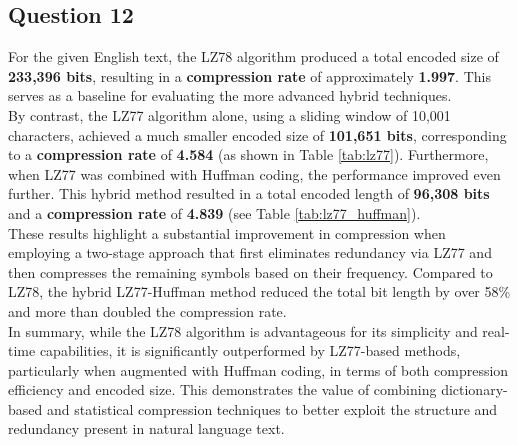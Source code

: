 \documentclass[]{template}
\begin{document}
    \subsection{Question 12}

    For the given English text, the LZ78 algorithm produced a total encoded size of \textbf{233,396 bits}, 
    resulting in a \textbf{compression rate} of approximately \textbf{1.997}. 
    This serves as a baseline for evaluating the more advanced hybrid techniques.\\

    \noindent
    By contrast, the LZ77 algorithm alone, using a sliding window of 10,001 characters, 
    achieved a much smaller encoded size of \textbf{101,651 bits}, corresponding to a \textbf{compression rate} of \textbf{4.584} (as shown in Table \ref{tab:lz77}). 
    Furthermore, when LZ77 was combined with Huffman coding, the performance improved even further.
    This hybrid method resulted in a total encoded length of \textbf{96,308 bits} and a \textbf{compression rate} of \textbf{4.839} (see Table \ref{tab:lz77_huffman}).\\

    \noindent
    These results highlight a substantial improvement in compression when employing a two-stage approach 
    that first eliminates redundancy via LZ77 and then compresses the remaining symbols based on their frequency. 
    Compared to LZ78, the hybrid LZ77-Huffman method reduced the total bit length by over 58\% and more than doubled the compression rate.\\

    \noindent
    In summary, while the LZ78 algorithm is advantageous for its simplicity and real-time capabilities, 
    it is significantly outperformed by LZ77-based methods, particularly when augmented with Huffman coding, 
    in terms of both compression efficiency and encoded size. This demonstrates the value of combining 
    dictionary-based and statistical compression techniques to better exploit the structure and redundancy 
    present in natural language text.
\end{document}
